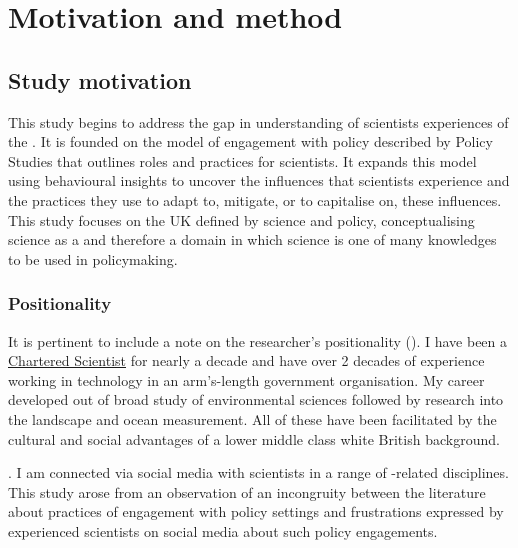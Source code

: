 \chapter{Motivation and method}\label{ch:methods}

\section{Study motivation}\label{sec:metmotivation}

This study begins to address the gap in understanding of scientists experiences of the \SPI. It is founded on the model of engagement with policy described by Policy Studies that outlines roles and practices for scientists. It expands this model using behavioural insights to uncover the influences that scientists experience and the practices they use to adapt to, mitigate, or to capitalise on, these influences. This study focuses on the UK \SPI{} defined by \CAN{} science and policy, conceptualising \CAN{} science as a \PNS{} and therefore a domain in which science is one of many knowledges to be used in policymaking. 

\subsection{Positionality}\label{sec:metpositionality}

It is pertinent to include a note on the researcher's positionality (\cite{CreswellP2017}). I have been a \href{https://sciencecouncil.org/scientists-science-technicians/which-professional-award-is-right-for-me/csci/}{Chartered Scientist} for nearly a decade and have over 2 decades of experience working in technology in an arm's-length government organisation. My career developed out of broad study of environmental sciences followed by research into the landscape and ocean measurement. All of these have been facilitated by the cultural and social advantages of a lower middle class white British background.

. I am connected via social media with scientists in a range of \CAN-related disciplines. This study arose from an observation of an incongruity between the literature about practices of engagement with policy settings and frustrations expressed by experienced scientists on social media about such policy engagements.

